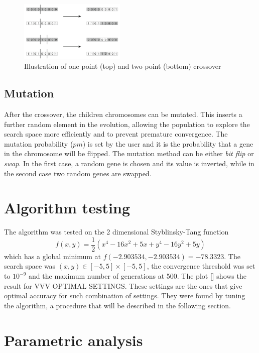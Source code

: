 \documentclass[twocolumn]{article}
\begin{document}
\begin{figure}[h]
  \begin{center}
    \includegraphics[width=0.45\textwidth]{crossover.png}
  \end{center} 
  \caption{Illustration of one point (top) and two point (bottom) crossover \cite{EvComputing}}\label{fig:1}
\end{figure}

\subsection{Mutation}
After the crossover, the children chromosomes can be mutated. This inserts a further random element in the evolution, allowing the population to explore the search space more efficiently and to prevent premature convergence.
The mutation probability ($pm$) is set by the user and it is the probability that a gene in the chromosome will be flipped. The mutation method can be either \textit{bit flip} or \textit{swap}. In the first case, a random gene is chosen and its value is inverted, while in the second case two random genes are swapped.

\section{Algorithm testing}
The algorithm was tested on the 2 dimensional Styblinsky-Tang function
\begin{equation}
  f(x, y) = \frac{1}{2} \left( x^4 - 16x^2 + 5x + y^4 - 16y^2 + 5y \right)
  \label{eq:Styblinsky-Tang}
\end{equation}
which has a global minimum at $f(-2.903534, -2.903534) = -78.3323$. The search space was \((x,y)\in[-5,5]\times[-5,5]\), the convergence threshold was set to $10^{-9}$ and the maximum number of generations at 500. The plot [] shows the result for VVV OPTIMAL SETTINGS.
These settings are the ones that give optimal accuracy for such combination of settings. They were found by tuning the algorithm, a procedure that will be described in the following section.

\section{Parametric analysis}
\end{document}
